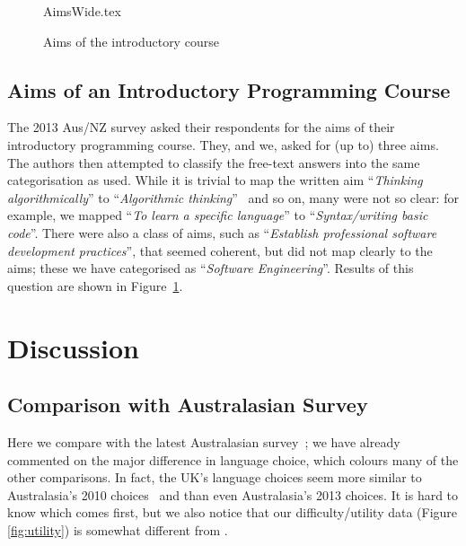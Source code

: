 \documentclass[english]{programming}
\begin{document}
\begin{figure}
\begin{center}
{AimsWide.tex}
\end{center}
\caption{Aims of the introductory course\label{fig:aims}}
\end{figure}

\subsection{Aims of an Introductory Programming Course}

The 2013 Aus/NZ survey asked their respondents for the aims of their
introductory programming course. They, and we, asked for (up to) three
aims. The authors then attempted to classify the free-text answers
into the same categorisation as \cite{mason+cooper:2014} used. While
it is trivial to map the written aim ``{\emph{Thinking
algorithmically}}'' to ``{\emph{Algorithmic
thinking}}''~\cite{mason+cooper:2014} and so on, many were not so
clear: for example, we mapped ``{\emph{To learn a specific
language}}'' to ``{\emph{Syntax/writing basic code}}''. There were
also a class of aims, such as ``{\emph{Establish professional software
development practices}}'', that seemed coherent, but did not map
clearly to the \cite{mason+cooper:2014} aims; these we have
categorised as ``{\emph{Software Engineering}}''. Results of this
question are shown in Figure~\ref{fig:aims}.


\section{Discussion}\label{discussion}

\subsection{Comparison with Australasian Survey}

Here we compare with the latest Australasian
survey~\cite{mason+cooper:2014}; we have already commented on the
major difference in language choice, which colours many of the other
comparisons. In fact, the UK's language choices seem more similar to
Australasia's 2010 choices~\cite{mason-et-al:2012} and \cite[Table
4]{mason+cooper:2014} than even Australasia's 2013 choices. It is hard
to know which comes first, but we also notice that our
difficulty/utility data (Figure \ref{fig:utility}) is somewhat
different from \cite[Figures 7/8]{mason+cooper:2014}.
\end{document}
